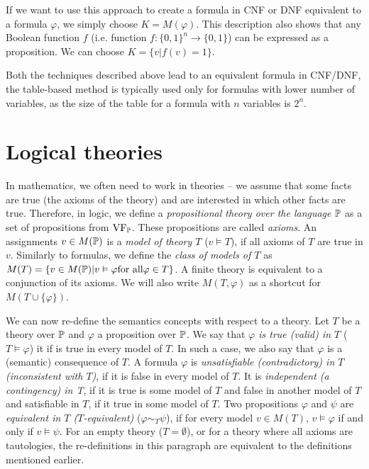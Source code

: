 If we want to use this approach to create a formula in CNF or DNF equivalent to a formula $\varphi$, we simply choose $K=M(\varphi)$. This description also shows that any Boolean function $f$ (i.e. function $f: \{0,1\}^n \to \{0,1\}$) can be expressed as a proposition. We can choose $K = \{v | f(v) = 1\}$. 

Both the techniques described above lead to an equivalent formula in CNF/DNF, the table-based method is typically used only for formulas with lower number of variables, as the size of the table for a formula with $n$ variables is $2^n$.

\section{Logical theories}

In mathematics, we often need to work in theories -- we assume that some facts are true (the axioms of the theory) and are interested in which other facts are true. Therefore, in logic, we define a \emph{propositional theory over the language $\mathbb{P}$} as a set of propositions from $\operatorname{VF}_\mathbb{P}$. These propositions are called \emph{axioms}. An assignments $v \in M(\mathbb{P})$ is a \emph{model of theory $T$} ($v \vDash T$), if all axioms of $T$ are true in $v$. Similarly to formulas, we define the \emph{class of models of $T$} as $M(T) = \{v \in M(\mathbb{P}) | v \vDash \varphi \text{for all} \varphi \in T\}$. A finite theory is equivalent to a conjunction of its axioms. We will also write $M(T, \varphi)$ as a shortcut for $M(T \cup \{\varphi\})$.

We can now re-define the semantics concepts with respect to a theory. Let $T$ be a theory over $\mathbb{P}$ and $\varphi$ a proposition over $\mathbb{P}$. We say that \emph{$\varphi$ is true (valid) in $T$} ($T\vDash \varphi$) it if is true in every model of $T$. In such a case, we also say that $\varphi$ is a (semantic) consequence of $T$. A formula $\varphi$ is \emph{unsatisfiable (contradictory) in $T$ (inconsistent with $T$)}, if it is false in every model of $T$. It is \emph{independent (a contingency) in T}, if it is true is some model of $T$ and false in another model of $T$ and satisfiable in $T$, if it true in some model of $T$. Two propositions $\varphi$ and $\psi$ are \emph{equivalent in $T$ ($T$-equivalent)} ($\varphi \sim_T \psi$), if for every model $v \in M(T)$, $v \vDash \varphi$ if and only if $v \vDash \psi$. For an empty theory ($T = \emptyset$), or for a theory where all axioms are tautologies, the re-definitions in this paragraph are equivalent to the definitions mentioned earlier.

